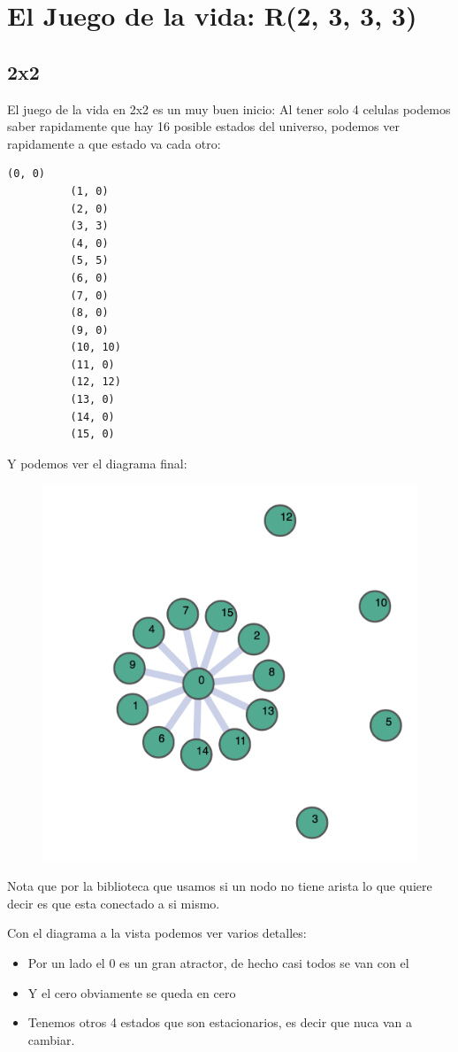 \documentclass[12pt, fleqn]{report}                             %
\theoremstyle{break}                                            %
\begin{document}
        
    \chapter{El Juego de la vida: R(2, 3, 3, 3)}

        \section{2x2}

        El juego de la vida en 2x2 es un muy buen inicio:
        Al tener solo 4 celulas podemos saber rapidamente que hay 16 posible estados del universo, podemos 
        ver rapidamente a que estado va cada otro:
        \begin{lstlisting}[gobble=9]
          (0, 0)
          (1, 0)
          (2, 0)
          (3, 3)
          (4, 0)
          (5, 5)
          (6, 0)
          (7, 0)
          (8, 0)
          (9, 0)
          (10, 10)
          (11, 0)
          (12, 12)
          (13, 0)
          (14, 0)
          (15, 0)
        \end{lstlisting}

        Y podemos ver el diagrama final:
        \begin{figure}[ht!]
          \centering
          \includegraphics[height=0.4\textwidth]{2life.png}
        \end{figure}

        Nota que por la biblioteca que usamos si un nodo no tiene arista lo que
        quiere decir es que esta conectado a si mismo.

        Con el diagrama a la vista podemos ver varios detalles:
        \begin{itemize}
          \item Por un lado el 0 es un gran atractor, de hecho casi todos se van con el
          \item Y el cero obviamente se queda en cero
          \item Tenemos otros 4 estados que son estacionarios, es decir que nuca van a cambiar.
        \end{itemize}
\end{document}
